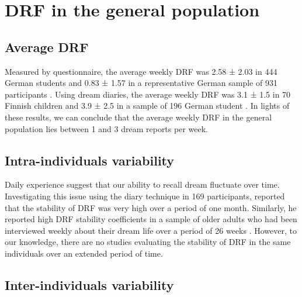 \section{DRF in the general population}
\label{sec:dream-recall:pop}

\subsection{Average DRF}
\label{sec:dream-recall:pop:avg}

Measured by questionnaire, the average weekly DRF was 2.58 ± 2.03 in 444 German students \citep{schredl_factors_2003} and 0.83 ± 1.57 in a representative German sample of 931 participants \citep{schredl_dream_2008}. Using dream diaries, the average weekly DRF was 3.1 ± 1.5 in 70 Finnish children \citep{valli_threat_2005} and 3.9 ± 2.5 in a sample of 196 German student \citep{schredl_reliability_2005}. In lights of these results, we can conclude that the average weekly DRF in the general population lies between 1 and 3 dream reports per week.

\subsection{Intra-individuals variability}
\label{sec:dream-recall:pop:intra}

Daily experience suggest that our ability to recall dream fluctuate over time. Investigating this issue using the diary technique in 169 participants, \citet{schredl_reliability_2005} reported that the stability of DRF was very high over a period of one month. Similarly, he reported high DRF stability coefficients in a sample of older adults who had been interviewed weekly about their dream life over a period of 26 weeks \citep{schredl_reliability_2001}. However, to our knowledge, there are no studies evaluating the stability of DRF in the same individuals over an extended period of time.

\subsection{Inter-individuals variability}
\label{sec:dream-recall:pop:inter}

